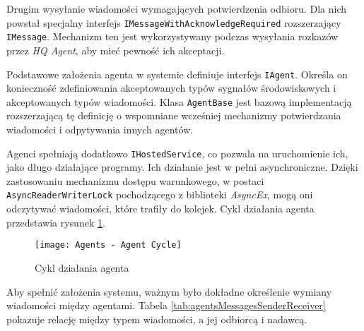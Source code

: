 \par Drugim wysyłanie wiadomości wymagających potwierdzenia odbioru. Dla nich powstał specjalny interfejs \texttt{IMessageWithAcknowledgeRequired} rozszerzający \texttt{IMessage}. Mechanizm ten jest wykorzystywany podczas wysyłania rozkazów przez \emph{HQ Agent}, aby mieć pewność ich akceptacji.

\par Podstawowe założenia agenta w systemie definiuje interfejs \texttt{IAgent}. Określa on konieczność zdefiniowania akceptowanych typów sygnałów środowiskowych i akceptowanych typów wiadomości. Klasa \texttt{AgentBase} jest bazową implementacją rozszerzającą tę definicję o wspomniane wcześniej mechanizmy potwierdzania wiadomości i odpytywania innych agentów.

\par Agenci spełniają dodatkowo \texttt{IHostedService}, co pozwala na uruchomienie ich, jako długo działające programy\cite{BACKGROUND_TASKS_WITH_HOSTED_SERVICES}. Ich działanie jest w pełni asynchroniczne. Dzięki zastosowaniu mechanizmu dostępu warunkowego, w postaci \texttt{AsyncReaderWriterLock} pochodzącego z biblioteki \emph{AsyncEx}\cite{STEPHEN_CLEARY_ASYNCEX_GITHUB}, mogą oni odczytywać wiadomości, które trafiły do kolejek. Cykl działania agenta przedstawia rysunek \ref{fig:agentsAgentCycle}.

\begin{figure}
    \centering
    \texttt{[image: Agents - Agent Cycle]}
    \caption{Cykl działania agenta}
    \label{fig:agentsAgentCycle}
\end{figure}

\par Aby spełnić założenia systemu, ważnym było dokładne określenie wymiany wiadomości między agentami. Tabela \ref{tab:agentsMessagesSenderReceiver} pokazuje relację między typem wiadomości, a jej odbiorcą i nadawcą.

